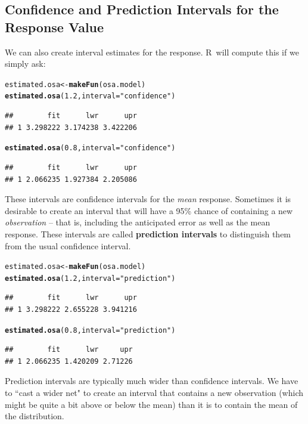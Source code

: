 \documentclass[twoside]{book}\usepackage[]{graphicx}\usepackage[]{xcolor}
\makeatletter
\newcommand{\hlnum}[1]{\textcolor[rgb]{0.686,0.059,0.569}{#1}}%
\newcommand{\hlstr}[1]{\textcolor[rgb]{0.192,0.494,0.8}{#1}}%
\newcommand{\hlstd}[1]{\textcolor[rgb]{0.345,0.345,0.345}{#1}}%
\newcommand{\hlkwb}[1]{\textcolor[rgb]{0.69,0.353,0.396}{#1}}%
\newcommand{\hlkwc}[1]{\textcolor[rgb]{0.333,0.667,0.333}{#1}}%
\newcommand{\hlkwd}[1]{\textcolor[rgb]{0.737,0.353,0.396}{\textbf{#1}}}%
\newenvironment{kframe}{%
 \def\at@end@of@kframe{}%
 \ifinner\ifhmode%
  \def\at@end@of@kframe{\end{minipage}}%
  \begin{minipage}{\columnwidth}%
 \fi\fi%
 \def\FrameCommand##1{\hskip\@totalleftmargin \hskip-\fboxsep
 \colorbox{shadecolor}{##1}\hskip-\fboxsep
     \hskip-\linewidth \hskip-\@totalleftmargin \hskip\columnwidth}%
 \MakeFramed {\advance\hsize-\width
   \@totalleftmargin\z@ \linewidth\hsize
   \@setminipage}}%
 {\par\unskip\endMakeFramed%
 \at@end@of@kframe}
\newenvironment{knitrout}{}{} %
\def\R{{\sf R}}
\def\term#1{\textbf{#1}}
\makeatother
\begin{document}
\subsection{Confidence and Prediction Intervals for the Response Value}
We can also create interval estimates for the response.    \R\ will compute
this if we simply ask:
\begin{knitrout}
\color{fgcolor}\begin{kframe}
\begin{alltt}
\hlstd{estimated.osa} \hlkwb{<-} \hlkwd{makeFun}\hlstd{(osa.model)}
\hlkwd{estimated.osa}\hlstd{(} \hlnum{1.2}\hlstd{,} \hlkwc{interval}\hlstd{=}\hlstr{"confidence"}\hlstd{)}
\end{alltt}
\begin{verbatim}
##        fit      lwr      upr
## 1 3.298222 3.174238 3.422206
\end{verbatim}
\begin{alltt}
\hlkwd{estimated.osa}\hlstd{(} \hlnum{0.8}\hlstd{,} \hlkwc{interval}\hlstd{=}\hlstr{"confidence"}\hlstd{)}
\end{alltt}
\begin{verbatim}
##        fit      lwr      upr
## 1 2.066235 1.927384 2.205086
\end{verbatim}
\end{kframe}
\end{knitrout}
These intervals are confidence intervals for the \emph{mean} response.  Sometimes it
is desirable to create an interval that will have a 95\% chance of containing a new 
\emph{observation} -- that is, including the anticipated error as well as the mean response.  These intervals are called \term{prediction intervals} to distinguish
them from the usual confidence interval.
\begin{knitrout}
\color{fgcolor}\begin{kframe}
\begin{alltt}
\hlstd{estimated.osa} \hlkwb{<-} \hlkwd{makeFun}\hlstd{(osa.model)}
\hlkwd{estimated.osa}\hlstd{(} \hlnum{1.2}\hlstd{,} \hlkwc{interval}\hlstd{=}\hlstr{"prediction"}\hlstd{)}
\end{alltt}
\begin{verbatim}
##        fit      lwr      upr
## 1 3.298222 2.655228 3.941216
\end{verbatim}
\begin{alltt}
\hlkwd{estimated.osa}\hlstd{(} \hlnum{0.8}\hlstd{,} \hlkwc{interval}\hlstd{=}\hlstr{"prediction"}\hlstd{)}
\end{alltt}
\begin{verbatim}
##        fit      lwr     upr
## 1 2.066235 1.420209 2.71226
\end{verbatim}
\end{kframe}
\end{knitrout}
Prediction intervals are typically much wider than confidence intervals.  We have to ``cast a wider net" 
to create an interval that contains a new observation (which might be quite a bit above 
or below the mean) than it is to contain the mean of the distribution.
\end{document}
